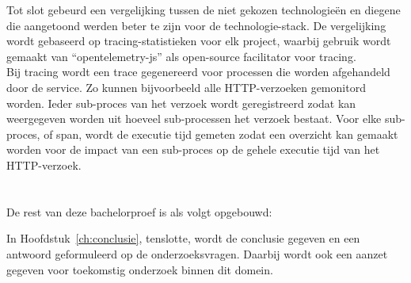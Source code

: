Tot slot gebeurd een vergelijking tussen de niet gekozen technologieën en diegene die aangetoond werden beter te zijn voor de technologie-stack. De vergelijking wordt gebaseerd op tracing-statistieken voor elk project, waarbij gebruik wordt gemaakt van ``opentelemetry-js'' als open-source facilitator voor tracing. \\
Bij tracing wordt een trace gegenereerd voor processen die worden afgehandeld door de service. Zo kunnen bijvoorbeeld alle \gls{HTTP}-verzoeken gemonitord worden. Ieder sub-proces van het verzoek wordt geregistreerd zodat kan weergegeven worden uit hoeveel sub-processen het verzoek bestaat. Voor elke sub-proces, of span, wordt de executie tijd gemeten zodat een overzicht kan gemaakt worden voor de impact van een sub-proces op de gehele executie tijd van het \gls{HTTP}-verzoek.

\section{}
\label{sec:opzet-bachelorproef}

De rest van deze bachelorproef is als volgt opgebouwd:


In Hoofdstuk~\ref{ch:conclusie}, tenslotte, wordt de conclusie gegeven en een antwoord geformuleerd op de onderzoeksvragen. Daarbij wordt ook een aanzet gegeven voor toekomstig onderzoek binnen dit domein.